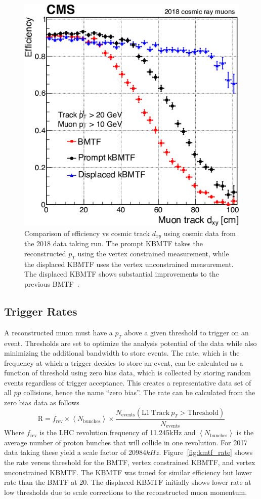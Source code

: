 \begin{figure}[htbp!]
	\centering
	\includegraphics[width=0.5\linewidth]{figs/04_muons/effVsDxy_kmtf.png}
	\caption[Comparison of efficiency vs cosmic track $d_{xy}$ using cosmic data from the 2018 data taking run. The prompt KBMTF takes the reconstructed $p_{T}$ using the vertex constrained measurement, while the displaced KBMTF uses the vertex unconstrained measurement. The displaced KBMTF shows substantial improvements to the previous BMTF~\cite{Hayrapetyan:2870088}]
	{Comparison of efficiency vs cosmic track $d_{xy}$ using cosmic data from the 2018 data taking run. The prompt KBMTF takes the reconstructed $p_{T}$ using the vertex constrained measurement, while the displaced KBMTF uses the vertex unconstrained measurement. The displaced KBMTF shows substantial improvements to the previous BMTF~\cite{Hayrapetyan:2870088}.}
	\label{fig:effVsDxy_kmtf}
\end{figure}

\subsection{Trigger Rates} \label{sec:kmtf_rate}
A reconstructed muon must have a $p_T$ above a given threshold to trigger on an event. Thresholds are set to optimize the analysis potential of the data while also minimizing the additional bandwidth to store events. The rate, which is the frequency at which a trigger decides to store an event, can be calculated as a function of threshold using zero bias data, which is collected by storing random events regardless of trigger acceptance. This creates a representative data set of all $pp$ collisions, hence the name ``zero bias''. The rate can be calculated from the zero bias data as follows
\begin{equation}
	\mathrm{R} = f_\mathrm{rev}\times \left<N_\mathrm{bunches}\right>\times\frac{N_\mathrm{events}(\mathrm{L1}\ \mathrm{Track}\ p_{T}>\mathrm{Threshold})}{N_\mathrm{events}}
\end{equation}
Where $f_\mathrm{rev}$ is the LHC revolution frequency of 11.245\unit{kHz} and $\left<N_\mathrm{bunches}\right>$ is the average number of proton bunches that will collide in one revolution. For 2017 data taking these yield a scale factor of 20984$\unit{kHz}$. Figure~\ref{fig:kmtf_rate} shows the rate versus threshold for the BMTF, vertex constrained KBMTF, and vertex unconstrained KBMTF. The KBMTF was tuned for similar efficiency but lower rate than the BMTF at 20\GeV. The displaced KBMTF initially shows lower rate at low \pt thresholds due to scale corrections to the reconstructed muon momentum.

